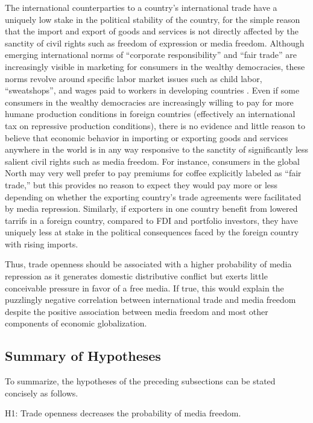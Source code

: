 \documentclass[12pt,a4paper]{article}\usepackage[]{graphicx}\usepackage[]{color}
\begin{document}
The international counterparties to a country's international trade have a uniquely low stake in the political stability of the country, for the simple reason that the import and export of goods and services is not directly affected by the sanctity of civil rights such as freedom of expression or media freedom. Although emerging international norms of “corporate responsibility” and “fair trade” are increasingly visible in marketing for consumers in the wealthy democracies, these norms revolve around specific labor market issues such as child labor, “sweatshops”, and wages paid to workers in developing countries \parencite{Moore:2004gy}. Even if some consumers in the wealthy democracies are increasingly willing to pay for more humane production conditions in foreign countries (effectively an international tax on repressive production conditions), there is no evidence and little reason to believe that economic behavior in importing or exporting goods and services anywhere in the world is in any way responsive to the sanctity of significantly less salient civil rights such as media freedom. For instance, consumers in the global North may very well prefer to pay premiums for coffee explicitly labeled as “fair trade,” but this provides no reason to expect they would pay more or less depending on whether the exporting country's trade agreements were facilitated by media repression. Similarly, if exporters in one country benefit from lowered tarrifs in a foreign country, compared to FDI and portfolio investors, they have uniquely less at stake in the political consequences faced by the foreign country with rising imports.

Thus, trade openness should be associated with a higher probability of media repression as it generates domestic distributive conflict but exerts little conceivable pressure in favor of a free media. If true, this would explain the puzzlingly negative correlation between international trade and media freedom despite the positive association between media freedom and most other components of economic globalization.

\subsection{Summary of Hypotheses}

To summarize, the hypotheses of the preceding subsections can be stated concisely as follows.

H1: Trade openness decreases the probability of media freedom.
\end{document}
